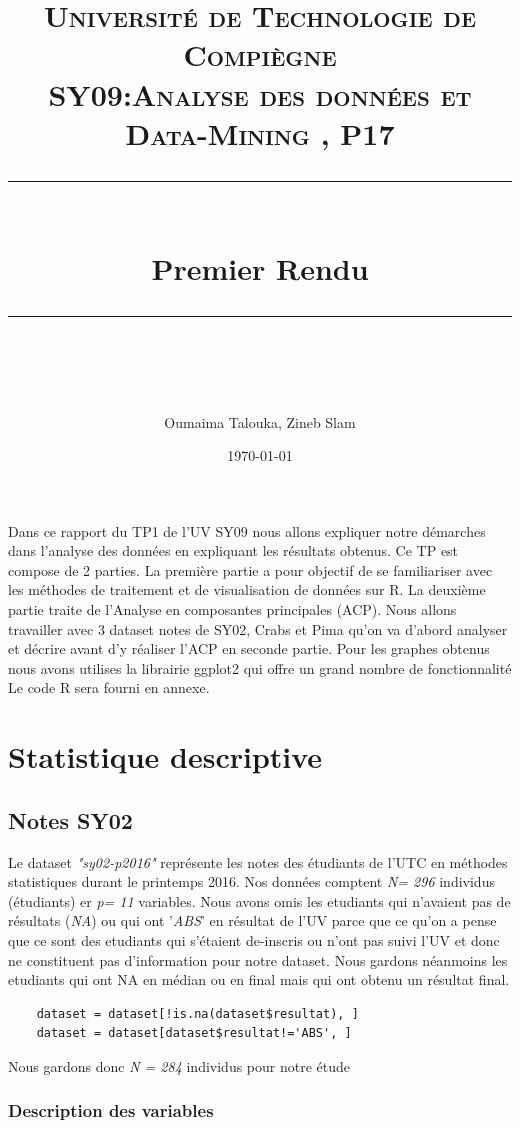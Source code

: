 \documentclass[10pt]{article}
\title{
	\normalfont \normalsize 
	\textsc{Université de Technologie de Compiègne\\ 
		SY09:Analyse des données et Data-Mining , P17} \\
	[10pt] 
	\rule{\linewidth}{0.5pt} \\[6pt] 
	\huge Premier Rendu \\
	\rule{\linewidth}{2pt}  \\[10pt]
}
\author{Oumaima Talouka, Zineb Slam}
\date{\normalsize \today}
\begin{document}
	
	{\let\newpage\relax\maketitle}
	
	Dans ce rapport du TP1 de l'UV SY09 nous allons expliquer notre démarches dans l'analyse des données en expliquant les résultats obtenus. Ce TP est compose de 2 parties. La première partie a pour objectif de se familiariser avec les méthodes de traitement et de visualisation de données sur R. La deuxième partie traite de l'Analyse en composantes principales (ACP). Nous allons travailler avec 3 dataset notes de SY02, Crabs et Pima qu'on va d'abord analyser et décrire avant d'y réaliser l'ACP en seconde partie. Pour les graphes obtenus nous avons utilises la librairie ggplot2 qui offre un grand nombre de fonctionnalité Le code R sera fourni en annexe.
	
	
	
	
	\section{ Statistique descriptive}
	
	\subsection{Notes SY02}
	Le dataset \textit{"sy02-p2016"} représente les notes des étudiants de l'UTC en méthodes statistiques durant le printemps 2016. Nos données comptent \textit{N= 296} individus (étudiants) er \textit{p= 11} variables. Nous avons omis  les etudiants qui n'avaient pas de résultats (\textit{NA}) ou qui ont '\textit{ABS}' en résultat de l'UV parce que ce qu'on a pense que ce sont des etudiants qui s'étaient de-inscris ou n'ont pas suivi l'UV et donc ne constituent pas d'information pour notre dataset. Nous gardons néanmoins les etudiants qui ont NA en médian ou en final mais qui ont obtenu un résultat final. 
	
	\begin{lstlisting}
	dataset = dataset[!is.na(dataset$resultat), ]
	dataset = dataset[dataset$resultat!='ABS', ]
	\end{lstlisting}
	
	Nous gardons donc \textit{N = 284} individus pour notre étude
	
	\subsubsection{Description des variables}
	
\end{document}
